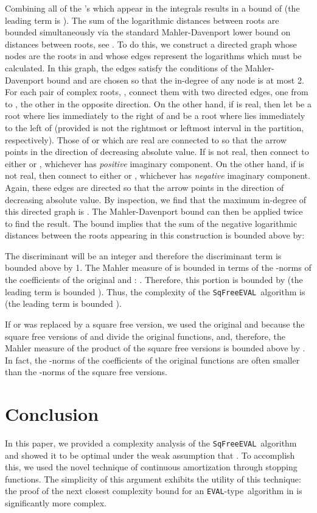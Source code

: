 \documentclass{amsart}
\theoremstyle{definition}
\newcommand{\EVAL}{\texttt{SqFreeEVAL}}
\newcommand{\EVALTYPE}{\texttt{EVAL}-type}
\begin{document}
Combining all of the 's which appear in the integrals results in a bound of  (the leading term is ).  The sum of the logarithmic distances between roots are bounded simultaneously via the standard Mahler-Davenport lower bound on distances between roots, see \citep{davenport:85,du-sharma-yap:sturm:07,eigenwillig-sharma-yap:descartes:06}.  To do this, we construct a directed graph whose nodes are the roots in  and whose edges represent the logarithms which must be calculated.  In this graph, the edges satisfy the conditions of the Mahler-Davenport bound and are chosen so that the in-degree of any node is at most 2.  For each pair of complex roots, , connect them with two directed edges, one from  to , the other in the opposite direction.  On the other hand, if  is real, then let  be a root where  lies immediately to the right of  and  be a root where  lies immediately to the left of  (provided  is not the rightmost or leftmost interval in the partition, respectively).  Those of  or  which are real are connected to  so that the arrow points in the direction of decreasing absolute value.  If  is not real, then connect  to either  or , whichever has {\em positive} imaginary component.  On the other hand, if  is not real, then connect  to either  or , whichever has {\em negative} imaginary component.  Again, these edges are directed so that the arrow points in the direction of decreasing absolute value.  By inspection, we find that the maximum in-degree of this directed graph is .  The Mahler-Davenport bound can then be applied twice to find the result.  The bound implies that the sum of the negative logarithmic distances between the roots appearing in this construction is bounded above by:

The discriminant will be an integer and therefore the discriminant term is bounded above by 1.  The Mahler measure of  is bounded in terms of the -norms of the coefficients of the original  and : .  Therefore, this portion is bounded by  (the leading term is bounded ).  Thus, the complexity of the \EVAL\ algorithm is  (the leading term is bounded ).

If  or  was replaced by a square free version, we used the original  and  because the square free versions of  and  divide the original functions, and, therefore, the Mahler measure of the product of the square free versions is bounded above by .  In fact, the -norms of the coefficients of the original functions are often smaller than the -norms of the square free versions.
\section{Conclusion}\label{Conc}
In this paper, we provided a complexity analysis of the \EVAL\ algorithm and showed it to be optimal under the weak assumption that .  To accomplish this, we used the novel technique of continuous amortization through stopping functions.  The simplicity of this argument exhibits the utility of this technique: the proof of the next closest complexity bound for an \EVALTYPE\ algorithm in \citep{sagraloff-yap:ceval:09} is significantly more complex.
\end{document}
